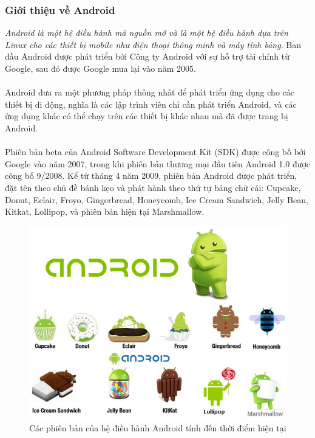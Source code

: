 \documentclass[a4paper]{article}
\begin{document}
\subsubsection{Giới thiệu về Android}
\textit{Android là một hệ điều hành mã nguồn mở và là một hệ điều hành dựa trên Linux cho các thiết bị mobile như điện thoại thông minh và máy tính bảng}. Ban đầu Android được phát triển bởi Công ty Android với sự hỗ trợ tài chính từ Google, sau đó được Google mua lại vào năm 2005.\\
\\
Android đưa ra một phương pháp thống nhất để phát triển ứng dụng cho các thiết bị di động, nghĩa là các lập trình viên chỉ cần phát triển Android, và các ứng dụng khác có thể chạy trên các thiết bị khác nhau mà đã được trang bị Android.\\
\\
Phiên bản beta của Android Software Development Kit (SDK) được công bố bởi Google vào năm 2007, trong khi phiên bản thương mại đầu tiên Android 1.0 được công bố 9/2008.  Kể từ tháng 4 năm 2009, phiên bản Android được phát triển, đặt tên theo chủ đề bánh kẹo và phát hành theo thứ tự bảng chữ cái: Cupcake, Donut, Eclair, Froyo, Gingerbread, Honeycomb, Ice Cream Sandwich, Jelly Bean, Kitkat, Lollipop, và phiên bản hiện tại Marshmallow.
\begin{center}
    \begin{figure}[h]
    \begin{center}
     \includegraphics[scale=.5]{android_version.jpg}
    \end{center}
    \caption{Các phiên bản của hệ điều hành Android tính đến thời điểm hiện tại}
    \label{refhinh1}
    \end{figure}
\end{center}
\end{document}
